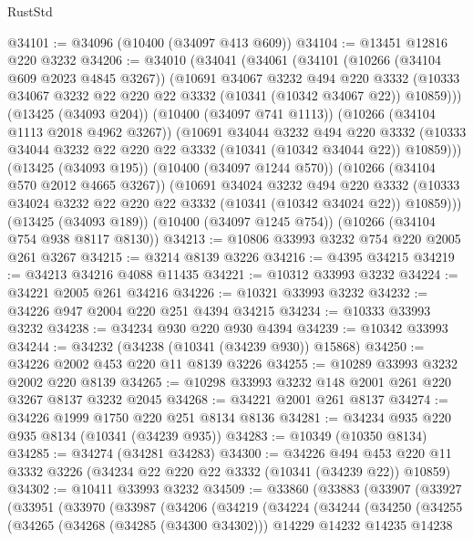 \begin{lexlean}{RustStd}
\begin{coremodule}
@34101 := @34096 (@10400 (@34097 @413 @609))
@34104 := @13451 @12816 @220 @3232
@34206 := @34010
    (@34041
      (@34061
        (@34101
          (@10266 (@34104 @609 @2023 @4845 @3267))
          (@10691
            @34067
            @3232
            @494
            @220
            @3332
            (@10333 @34067 @3232 @22 @220 @22 @3332 (@10341 (@10342 @34067 @22)) @10859)))
        (@13425 (@34093 @204))
        (@10400 (@34097 @741 @1113))
        (@10266 (@34104 @1113 @2018 @4962 @3267))
        (@10691
          @34044
          @3232
          @494
          @220
          @3332
          (@10333 @34044 @3232 @22 @220 @22 @3332 (@10341 (@10342 @34044 @22)) @10859)))
      (@13425 (@34093 @195))
      (@10400 (@34097 @1244 @570))
      (@10266 (@34104 @570 @2012 @4665 @3267))
      (@10691
        @34024
        @3232
        @494
        @220
        @3332
        (@10333 @34024 @3232 @22 @220 @22 @3332 (@10341 (@10342 @34024 @22)) @10859)))
    (@13425 (@34093 @189))
    (@10400 (@34097 @1245 @754))
    (@10266 (@34104 @754 @938 @8117 @8130))
@34213 := @10806 @33993 @3232 @754 @220 @2005 @261 @3267
@34215 := @3214 @8139 @3226
@34216 := @4395 @34215
@34219 := @34213 @34216 @4088 @11435
@34221 := @10312 @33993 @3232
@34224 := @34221 @2005 @261 @34216
@34226 := @10321 @33993 @3232
@34232 := @34226 @947 @2004 @220 @251 @4394 @34215
@34234 := @10333 @33993 @3232
@34238 := @34234 @930 @220 @930 @4394
@34239 := @10342 @33993
@34244 := @34232 (@34238 (@10341 (@34239 @930)) @15868)
@34250 := @34226 @2002 @453 @220 @11 @8139 @3226
@34255 := @10289 @33993 @3232 @2002 @220 @8139
@34265 := @10298 @33993 @3232 @148 @2001 @261 @220 @3267 @8137 @3232 @2045
@34268 := @34221 @2001 @261 @8137
@34274 := @34226 @1999 @1750 @220 @251 @8134 @8136
@34281 := @34234 @935 @220 @935 @8134 (@10341 (@34239 @935))
@34283 := @10349 (@10350 @8134)
@34285 := @34274 (@34281 @34283)
@34300 := @34226
    @494
    @453
    @220
    @11
    @3332
    @3226
    (@34234 @22 @220 @22 @3332 (@10341 (@34239 @22)) @10859)
@34302 := @10411 @33993 @3232
@34509 := @33860
    (@33883
      (@33907
        (@33927
          (@33951
            (@33970
              (@33987
                (@34206
                  (@34219
                    (@34224
                      (@34244
                        (@34250
                          (@34255
                            (@34265
                              (@34268 (@34285 (@34300 @34302)))
                              @14229
                              @14232
                              @14235
                              @14238

\end{coremodule}
\end{lexlean}
